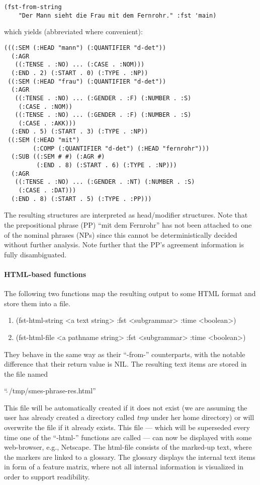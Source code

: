 \begin{verbatim}
(fst-from-string 
    "Der Mann sieht die Frau mit dem Fernrohr." :fst 'main)
 \end{verbatim}

\noindent which yields (abbreviated where convenient):

\begin{verbatim}
(((:SEM (:HEAD "mann") (:QUANTIFIER "d-det"))
  (:AGR
   ((:TENSE . :NO) ... (:CASE . :NOM)))
  (:END . 2) (:START . 0) (:TYPE . :NP))
 ((:SEM (:HEAD "frau") (:QUANTIFIER "d-det"))
  (:AGR
   ((:TENSE . :NO) ... (:GENDER . :F) (:NUMBER . :S)
    (:CASE . :NOM))
   ((:TENSE . :NO) ... (:GENDER . :F) (:NUMBER . :S)
    (:CASE . :AKK)))
  (:END . 5) (:START . 3) (:TYPE . :NP))
 ((:SEM (:HEAD "mit") 
        (:COMP (:QUANTIFIER "d-det") (:HEAD "fernrohr")))
  (:SUB ((:SEM # #) (:AGR #) 
         (:END . 8) (:START . 6) (:TYPE . :NP)))
  (:AGR
   ((:TENSE . :NO) ... (:GENDER . :NT) (:NUMBER . :S)
    (:CASE . :DAT)))
  (:END . 8) (:START . 5) (:TYPE . :PP)))
\end{verbatim}

The resulting structures are interpreted as head/modifier structures. 
Note that the prepositional phrase (PP)
``mit dem Fernrohr'' has not been attached to one of
the nominal phrases (NPs) since this cannot be deterministically
decided without further analysis.
Note further that the PP's agreement information is fully disambiguated.

\paragraph{HTML-based functions}

The following two functions map the resulting output to some HTML
format and store them into a file.
\begin{enumerate}

\item   {\sc (fst-html-string <a text string>  :fst <subgrammar> :time <boolean>)}
\item   {\sc (fst-html-file <a pathname string> :fst <subgrammar> :time <boolean>)}

\end{enumerate}

They behave in the same way as their ``{\sc -from-}'' counterparts, with the
notable difference that their return value is {\sc NIL}. 
The resulting text items are stored in the file named
\begin{center}
``$\tilde{~}$/tmp/smes-phrase-res.html''
\end{center}
\noindent This file will be automatically created if it does not exist
(we are assuming the user has already created a directory called {\em
tmp} under her home directory) or will overwrite the file if it already exists.
This file --- which will be superseded every time one of the ``{\sc -html-}''
functions are called --- can now be displayed with some web-browser,
e.g., Netscape. The {\sc html}-file consists of the marked-up text, where the
markers are linked to a glossary. The glossary displays 
the internal text items in form of a feature matrix, where
not all internal information is visualized in order to support readibility.

